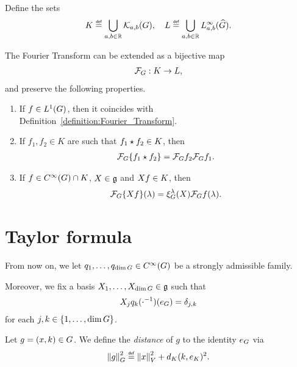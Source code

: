 \begin{proposition}
    Define the sets
    \begin{align*}
        K \defeq \bigcup_{a, b \in \R} \KernelsSobolev{a}{b}, \quad
        L \defeq \bigcup_{a, b \in \R} \LebesgueDual[a, b]{\infty}{\Group}.
    \end{align*}

    The Fourier Transform can be extended as a bijective map
    \begin{align*}
        \mathcal{F}_{G} : K \to L,
    \end{align*}
    and preserve the following properties.
    \begin{enumerate}
        \item If $f \in {L^{1} (G)}$, then it coincides with Definition~\ref{definition:Fourier_Transform}.
        \item If $f_1, f_2 \in K$ are such that $f_1 \star f_2 \in K$, then
            \begin{align*}
                \mathcal{F}_{G}\{f_1 \star f_2\} = \mathcal{F}_{G} f_2 \mathcal{F}_{G} f_1.
            \end{align*}
        \item If $f \in {C^\infty(G)} \cap K$, $X \in \mathfrak{g}$ and ${X} f \in K$, then
            \begin{align*}
                \mathcal{F}_{G}\{{X} f\}(\lambda) = \xi^{\lambda}_{G}(X) \mathcal{F}_{G} f(\lambda).
            \end{align*}
    \end{enumerate}
\end{proposition}

\section{Taylor formula}

From now on,
we let $q_1, \dots, q_{\dim G} \in {C^\infty(G)}$
be a strongly admissible family.

Moreover, we fix a basis $X_1, \dots, X_{\dim G} \in \mathfrak{g}$ such that
\begin{align*}
    {X_j} q_k(\cdot^{-1})(e_G) = \delta_{j,k}
\end{align*}
for each $j, k \in \{1, \dots, \dim G\}$.

\begin{definition}
    Let $g = (x, k) \in G$.
    We define the \emph{distance} of $g$ to the identity $e_G$ via
    \begin{align*}
        \norm [\Group] g^2
        \defeq
        \norm x^2 + \dist [\CompactGroup] k {e_\CompactGroup}^2.
    \end{align*}
\end{definition}

